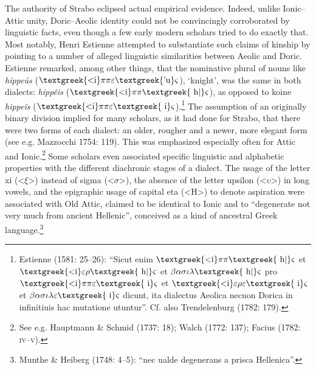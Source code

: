 \begin{styleStandard}
The authority of Strabo eclipsed actual empirical evidence. Indeed, unlike Ionic–Attic unity, Doric–Aeolic identity could not be convincingly corroborated by linguistic facts, even though a few early modern scholars tried to do exactly that. Most notably, Henri Estienne attempted to substantiate such claims of kinship by pointing to a number of alleged linguistic similarities between Aeolic and Doric. Estienne remarked, among other things, that the nominative plural of nouns like \textit{hippeús} ($\text{\textgreek{<i}}\pi \pi \varepsilon \text{\textgreek{'u}}\varsigma $), ‘knight’, was the same in both dialects: \textit{hippêis} ($\text{\textgreek{<i}}\pi \pi \text{\textgreek{~h|}}\varsigma $), as opposed to koine \textit{hippeîs} ($\text{\textgreek{<i}}\pi \pi \varepsilon \text{\textgreek{~i}}\varsigma $).\footnote{ Estienne (1581: 25–26): “Sicut enim $\text{\textgreek{<i}}\pi \pi \text{\textgreek{~h|}}\varsigma $ et $\text{\textgreek{<i}}\varepsilon \rho \text{\textgreek{~h|}}\varsigma $ et $\beta \alpha \sigma \iota \lambda \text{\textgreek{~h|}}\varsigma $ pro $\text{\textgreek{<i}}\pi \pi \varepsilon \text{\textgreek{~i}}\varsigma $ et $\text{\textgreek{<i}}\varepsilon \rho \varepsilon \text{\textgreek{~i}}\varsigma $ et $\beta \alpha \sigma \iota \lambda \varepsilon \text{\textgreek{~i}}\varsigma $ dicunt, ita dialectus Aeolica necnon Dorica in infinitiuis hac mutatione utuntur”. Cf. also Trendelenburg (1782: 179).} The assumption of an originally binary division implied for many scholars, as it had done for Strabo, that there were two forms of each dialect: an older, rougher and a newer, more elegant form (see e.g. Mazzocchi 1754: 119). This was emphasized especially often for Attic and Ionic.\footnote{ See e.g. Hauptmann \& Schmid (1737: 18); Walch (1772: 137); Facius (1782: \textsc{iv–v}).} Some scholars even associated specific linguistic and alphabetic properties with the different diachronic stages of a dialect. The usage of the letter xi ({\textless}$\xi ${\textgreater}) instead of sigma ({\textless}$\sigma ${\textgreater}), the absence of the letter upsilon ({\textless}$\upsilon ${\textgreater}) in long vowels, and the epigraphic usage of capital eta ({\textless}H{\textgreater}) to denote aspiration were associated with Old Attic, claimed to be identical to Ionic and to “degenerate not very much from ancient Hellenic”, conceived as a kind of ancestral Greek language.\footnote{ Munthe \& Heiberg (1748: 4–5): “nec ualde degenerans a prisca Hellenica”.}
\end{styleStandard}

